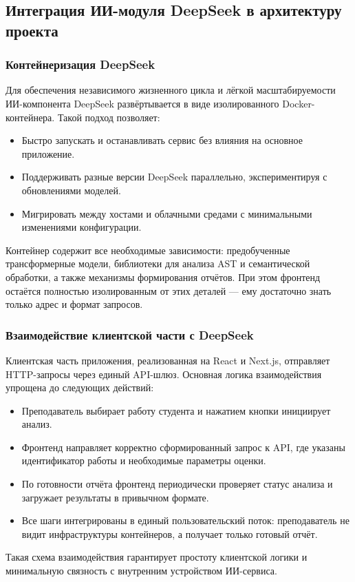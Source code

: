 \subsection{Интеграция ИИ-модуля DeepSeek в архитектуру проекта}

\subsubsection{Контейнеризация DeepSeek}
Для обеспечения независимого жизненного цикла и лёгкой масштабируемости ИИ-компонента DeepSeek развёртывается в виде изолированного Docker-контейнера. Такой подход позволяет:
\begin{itemize}
	\item Быстро запускать и останавливать сервис без влияния на основное приложение.
	\item Поддерживать разные версии DeepSeek параллельно, экспериментируя с обновлениями моделей.
	\item Мигрировать между хостами и облачными средами с минимальными изменениями конфигурации.
\end{itemize}
Контейнер содержит все необходимые зависимости: предобученные трансформерные модели, библиотеки для анализа AST и семантической обработки, а также механизмы формирования отчётов. При этом фронтенд остаётся полностью изолированным от этих деталей — ему достаточно знать только адрес и формат запросов.

\subsubsection{Взаимодействие клиентской части с DeepSeek}
Клиентская часть приложения, реализованная на React и Next.js, отправляет HTTP-запросы через единый API-шлюз. Основная логика взаимодействия упрощена до следующих действий:
\begin{itemize}
	\item Преподаватель выбирает работу студента и нажатием кнопки инициирует анализ.
	\item Фронтенд направляет корректно сформированный запрос к API, где указаны идентификатор работы и необходимые параметры оценки.
	\item По готовности отчёта фронтенд периодически проверяет статус анализа и загружает результаты в привычном формате.
	\item Все шаги интегрированы в единый пользовательский поток: преподаватель не видит инфраструктуры контейнеров, а получает только готовый отчёт.
\end{itemize}
Такая схема взаимодействия гарантирует простоту клиентской логики и минимальную связность с внутренним устройством ИИ-сервиса.

